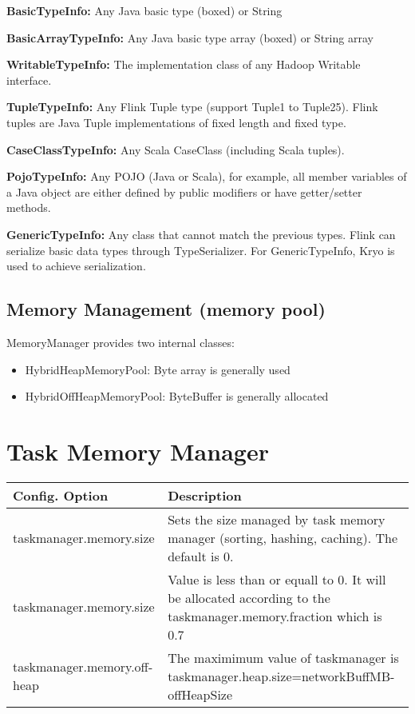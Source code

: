 \textbf{BasicTypeInfo:} Any Java basic type (boxed) or String

\textbf{BasicArrayTypeInfo:} Any Java basic type array (boxed) or
String array

\textbf{WritableTypeInfo:} The implementation class of any Hadoop
Writable interface.

\textbf{TupleTypeInfo:} Any Flink Tuple type (support Tuple1 to
Tuple25). Flink tuples are Java Tuple implementations of fixed length
and fixed type.

\textbf{CaseClassTypeInfo:} Any Scala CaseClass (including Scala
tuples).

\textbf{PojoTypeInfo:} Any POJO (Java or Scala), for example, all
member variables of a Java object are either defined by public
modifiers or have getter/setter methods.

\textbf{GenericTypeInfo:} Any class that cannot match the previous
types. Flink can serialize basic data types through TypeSerializer.
For GenericTypeInfo, Kryo is used to achieve serialization.

\subsection*{Memory Management (memory pool)}
MemoryManager provides two internal classes:%

\begin{itemize}
	\item{HybridHeapMemoryPool: Byte array is generally used}

	\item{HybridOffHeapMemoryPool: ByteBuffer is generally allocated} 
\end{itemize}

\section*{Task Memory Manager}
\begin{center}
	\begin{tabular}{|l|l|}
		\hline
		Config. Option & Description \\
		\hline
		taskmanager.memory.size		& Sets the size managed by task memory
									  manager (sorting, hashing,
									  caching).  The default is 0. \\
		\hline
		taskmanager.memory.size		& Value is less than or equall to 0.
									  It will be allocated according
									  to the
									  taskmanager.memory.fraction
									  which is 0.7 \\
		\hline
		taskmanager.memory.off-heap & The maximimum value of
									  taskmanager is
									  taskmanager.heap.size=networkBuffMB-offHeapSize
	\end{tabular}
\end{center}
